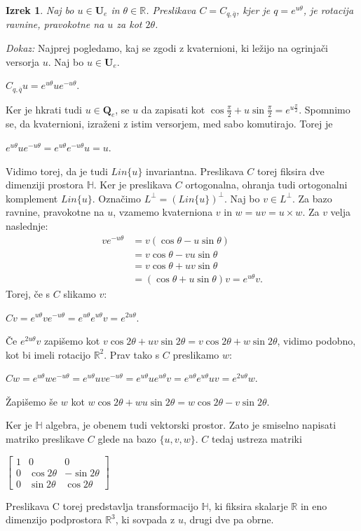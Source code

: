 \documentclass[a4paper,12pt]{article}
\def\R{\mathbb{R}} %
\def\H{\mathbb{H}} %
\def\Qe{\textbf{Q}_{e}} %
\def\Ue{\textbf{U}_{e}} %
\newcommand{\conj}[1]{\overline{#1}}
\newtheorem{izrek}{Izrek}
\begin{document}
\begin{izrek}
Naj bo $u \in \Ue$ in $\theta \in \R$. Preslikava $C = C_{q, \conj{q}}$, kjer je $q = e^{u\theta}$, je rotacija ravnine, 
pravokotne na $u$ za kot $2\theta$.
\end{izrek}
\break
\noindent
{\em Dokaz:\/} Najprej pogledamo, kaj se zgodi z kvaternioni, ki ležijo na ogrinjači versorja $u$.
Naj bo $u \in \Ue$.
\begin{center}
   $C_{q,\conj{q}}u = e^{u\theta} u e^{-u\theta}$.
\end{center}
Ker je hkrati tudi $u \in \Qe$, se $u$ da zapisati kot $\cos\frac{\pi}{2} + u\sin\frac{\pi}{2} = e^{u\frac{\pi}{2}}$.
Spomnimo se, da kvaternioni, izraženi z istim versorjem, med sabo komutirajo. Torej je
\begin{center}
   $e^{u\theta} u e^{-u\theta} = e^{u\theta}e^{-u\theta}u = u$.
\end{center}
Vidimo torej, da je tudi $Lin\{u\}$ invariantna. Preslikava $C$ torej fiksira dve dimenziji prostora $\H$.
Ker je preslikava $C$ ortogonalna, ohranja tudi ortogonalni komplement $Lin\{u\}$.
Označimo $L^{\bot} = (Lin\{u\})^{\bot}$. Naj bo $v \in L^{\bot}$. Za bazo ravnine, pravokotne na $u$, vzamemo kvaterniona $v$ in $w = uv = u \times w$.
Za $v$ velja naslednje:
\begin{align*}
   v e^{-u\theta} & = v(\cos\theta -u\sin\theta) \\
   & = v\cos\theta -vu \sin\theta \\
   & = v\cos\theta + uv\sin\theta \\
   & = (\cos\theta +u\sin\theta)v = e^{u\theta}v.
\end{align*}
Torej, če s $C$ slikamo $v$:
\begin{center}
   $Cv = e^{u\theta}v e^{-u\theta} = e^{u\theta}e^{u\theta}v = e^{2u\theta}$.
\end{center}
Če $e^{2u\theta}v$ zapišemo kot $v\cos2\theta + uv\sin2\theta = v\cos2\theta + w\sin2\theta$, vidimo podobno, kot bi imeli rotacijo $\R^2$. Prav tako s $C$ preslikamo $w$:
\begin{center}
   $Cw = e^{u\theta}w e^{-u\theta} = e^{u\theta}uve^{-u\theta} = e^{u\theta}ue^{u\theta}v = e^{u\theta}e^{u\theta}uv = e^{2u\theta}w$.
\end{center}
Žapišemo še $w$ kot $w\cos2\theta + wu\sin2\theta = w\cos2\theta - v\sin2\theta$.

Ker je $\H$ algebra, je obenem tudi vektorski prostor. Zato je smiselno napisati matriko preslikave $C$ glede na bazo $\{u, v, w\}$.
$C$ tedaj ustreza matriki
\begin{center}
   $
   \begin{bmatrix}
      1 & 0 & 0 \\
      0 & \cos2\theta & -\sin2\theta \\
      0 & \sin2\theta & \cos2\theta
   \end{bmatrix}
   $
\end{center}
Preslikava C torej predstavlja transformacijo $\H$, ki fiksira skalarje $\R$ in eno dimenzijo podprostora $\R^3$, ki sovpada z $u$, drugi dve pa obrne.
\end{document}
